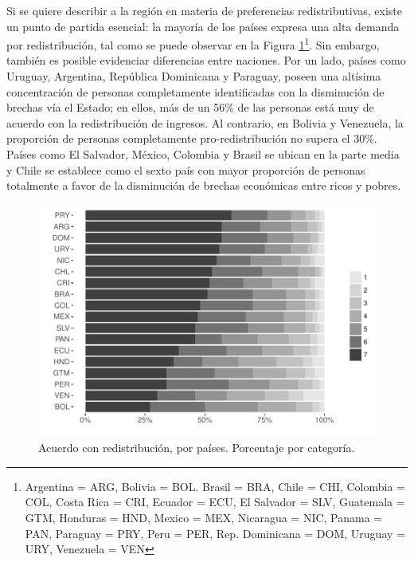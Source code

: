 \documentclass[12pt,letterpaper]{article}
\begin{document}
Si se quiere describir a la región en materia de preferencias redistributivas, existe un punto de partida esencial: la mayoría de los países expresa una alta demanda por redistribución, tal como se puede observar en la Figura \ref{fig:g1}\footnote{Argentina = ARG, Bolivia = BOL. Brasil = BRA, Chile = CHI, Colombia = COL, Costa Rica = CRI, Ecuador = ECU, El Salvador = SLV, Guatemala = GTM, Honduras = HND, Mexico = MEX, Nicaragua = NIC, Panama = PAN, Paraguay = PRY, Peru = PER, Rep. Dominicana = DOM, Uruguay = URY, Venezuela = VEN}. Sin embargo, también es posible evidenciar diferencias entre naciones. Por un lado, países como Uruguay, Argentina, República Dominicana y Paraguay, poseen una altísima concentración de personas completamente identificadas con la disminución de brechas vía el Estado; en ellos, más de un 56\% de las personas está muy de acuerdo con la redistribución de ingresos. Al contrario, en Bolivia y Venezuela, la proporción de personas completamente pro-redistribución no supera el 30\%. Países como El Salvador, México, Colombia y Brasil se ubican en la parte media y Chile se establece como el sexto país con mayor proporción de personas totalmente a favor de la disminución de brechas económicas entre ricos y pobres.\\

\begin{figure}[t]
	\begin{center}
		\includegraphics[width=1\textwidth]{G1.pdf}
		\caption[Acuerdo con redistribución, por países.]{Acuerdo con redistribución, por países. Porcentaje por categoría.}
		\label{fig:g1}
	\end{center}
\end{figure}
\end{document}
